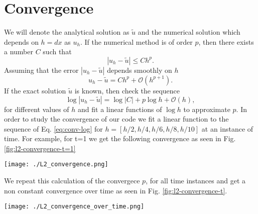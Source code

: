 \documentclass[reprint, aps, prd, nofootinbib, superscriptaddress, floatfix]{revtex4-2}  %
\begin{document}
\section{Convergence}
We will denote the analytical solution as $\tilde{u}$ and the numerical solution which depends on $h=dx$ as $u_h$. If the numerical method is of order $p$, then there exists a number $C$ such that
\begin{equation}
  \label{eq:conv-cond}
  |u_h - \tilde{u}| \leq C h^p.
\end{equation}
Assuming that the error $|u_h - \tilde{u}|$ depends smoothly on $h$
\begin{equation}
  \label{eq:conv-cond2}
  u_h - \tilde{u} = C h^p + \mathcal{O}(h^{p+1}).
\end{equation}
If the exact solution $\tilde{u}$ is known, then check the sequence
\begin{equation}
  \label{eq:conv-log}
  \log|u_h-\tilde{u}| = \log|C|+p\log h + \mathcal{O}(h),
\end{equation}
for different values of $h$ and fit a linear functions of $\log h$ to approximate $p$.
In order to study the convergence of our code we fit a linear function to the sequence of Eq. \ref{eq:conv-log} for $h=[h/2, h/4, h/6, h/8, h/10]$ at an instance of time. For example, for t=1 we get the following convergence as seen in Fig. \ref{fig:l2-convergence-t=1}
\begin{figure*}[htbp]
  \texttt{[image: ./L2\_convergence.png]}
  \caption{Convergence of $L_2$ norm for t=1. The left subfigure shows the convergence of $\pi$ and the right subfigure shows the convergence of $\xi$. We see here that the convergence is p=2.5.}
  \label{fig:l2-convergence-t=1}
\end{figure*}
We repeat this calculation of the convergece $p$, for all time instances and get a non constant convergence over time as seen in Fig. \ref{fig:l2-convergence-t}.
\begin{figure*}[htbp]
  \texttt{[image: ./L2\_convergence\_over\_time.png]}
  \caption{Convergence of $L_2$ norm for t=1. The left subfigure shows the convergence over time of $\pi$ and the right subfigure shows the convergence over time of $\xi$. We see that it is not constant.}
  \label{fig:l2-convergence-t}
\end{figure*}
\end{document}
